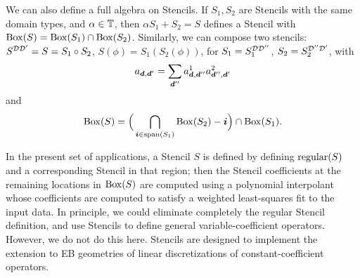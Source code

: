 \documentclass[12pt]{article}
\newcommand{\regular}{{\rm{regular}}}
\newcommand{\spanEB}{{\rm{span}}}
\newcommand{\dgen}{{\mbf{d}}}
\begin{document}
We can also define a full algebra on Stencils. If $S_1,S_2$ are Stencils with the same domain types, and $\alpha \in \mathbb{T}$, then
$\alpha S_1 + S_2= S$ defines a Stencil with ${\rm Box}(S) = {\rm Box}(S_1) \cap {\rm Box}(S_2)$. Similarly, we can compose two stencils: $S^{{\mathcal{D}}{\mathcal{D}}'}= S = S_1 \circ S_2$, $S(\phi) = S_1(S_2(\phi))$, for $S_1 = S_1^{{\mathcal{D}}{\mathcal{D}}''}$, $S_2 = S_2^{{\mathcal{D''}}{\mathcal{D}}'}$,
with
\begin{gather*}
a_{\dgen,\dgen'} = \sum \limits_{\dgen ''} a_{\dgen,\dgen''}^1 a_{\dgen'',\dgen'}^2
\end{gather*}
and 
\begin{gather*}
\MBox(S) = \Big(\bigcap \limits_{\mbf{i} \in \spanEB(S_1)} \MBox(S_2) - \mbf{i} \Big) \cap \MBox(S_1).
\end{gather*}

In the present set of applications, a Stencil $S$ is defined by defining $\regular(S)$ and a corresponding  Stencil in that region; then the Stencil coefficients at the remaining locations in ${\rm Box}(S)$ are computed using a polynomial interpolant whose coefficients are computed to satisfy a weighted least-squares fit to the input data. In principle, we could eliminate completely the regular Stencil definition, and use Stencils to define general variable-coefficient operators. However, we do not do this here. Stencils are designed to implement the extension to EB geometries of linear discretizations of constant-coefficient operators.
\end{document}
